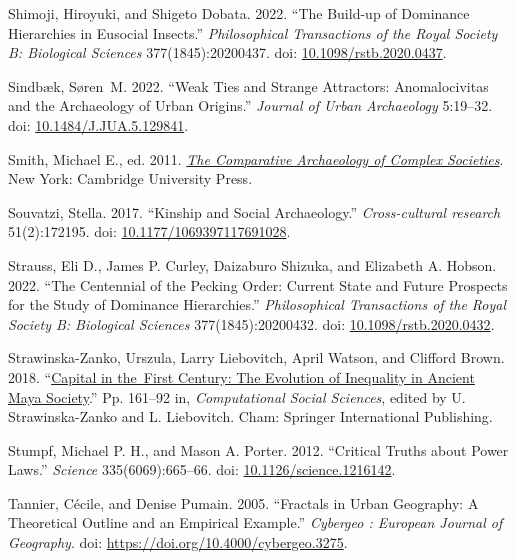 \documentclass[
  12pt,
]{book}
\newlength{\cslhangindent}
\newlength{\cslentryspacingunit} %
\newenvironment{CSLReferences}[2] %
 {%
  \setlength{\parindent}{0pt}
  \ifodd #1
  \let\oldpar\par
  \def\par{\hangindent=\cslhangindent\oldpar}
  \fi
  \setlength{\parskip}{#2\cslentryspacingunit}
 }%
 {}
\begin{document}
\begin{CSLReferences}{1}{0}
\leavevmode{}%
Shimoji, Hiroyuki, and Shigeto Dobata. 2022. {``The Build-up of Dominance Hierarchies in Eusocial Insects.''} \emph{Philosophical Transactions of the Royal Society B: Biological Sciences} 377(1845):20200437. doi: \href{https://doi.org/10.1098/rstb.2020.0437}{10.1098/rstb.2020.0437}.

\leavevmode{}%
Sindbæk, Søren~M. 2022. {``Weak Ties and Strange Attractors: Anomalocivitas and the Archaeology of Urban Origins.''} \emph{Journal of Urban Archaeology} 5:19--32. doi: \href{https://doi.org/10.1484/J.JUA.5.129841}{10.1484/J.JUA.5.129841}.

\leavevmode{}%
Smith, Michael E., ed. 2011. \emph{\href{https://doi.org/10.1017/CBO9781139022712}{The Comparative Archaeology of Complex Societies}}. New York: Cambridge University Press.

\leavevmode{}%
Souvatzi, Stella. 2017. {``Kinship and Social Archaeology.''} \emph{Cross-cultural research} 51(2):172195. doi: \href{https://doi.org/10.1177/1069397117691028}{10.1177/1069397117691028}.

\leavevmode{}%
Strauss, Eli D., James P. Curley, Daizaburo Shizuka, and Elizabeth A. Hobson. 2022. {``The Centennial of the Pecking Order: Current State and Future Prospects for the Study of Dominance Hierarchies.''} \emph{Philosophical Transactions of the Royal Society B: Biological Sciences} 377(1845):20200432. doi: \href{https://doi.org/10.1098/rstb.2020.0432}{10.1098/rstb.2020.0432}.

\leavevmode{}%
Strawinska-Zanko, Urszula, Larry Liebovitch, April Watson, and Clifford Brown. 2018. {``\href{https://doi.org/10.1007/978-3-319-76765-9_9}{Capital in the~First Century: The Evolution of Inequality in Ancient Maya Society}.''} Pp. 161--92 in, \emph{Computational Social Sciences}, edited by U. Strawinska-Zanko and L. Liebovitch. Cham: Springer International Publishing.

\leavevmode{}%
Stumpf, Michael P. H., and Mason A. Porter. 2012. {``Critical Truths about Power Laws.''} \emph{Science} 335(6069):665--66. doi: \href{https://doi.org/10.1126/science.1216142}{10.1126/science.1216142}.

\leavevmode{}%
Tannier, Cécile, and Denise Pumain. 2005. {``Fractals in Urban Geography: A Theoretical Outline and an Empirical Example.''} \emph{Cybergeo : European Journal of Geography}. doi: \url{https://doi.org/10.4000/cybergeo.3275}.


\end{CSLReferences}
\end{document}
